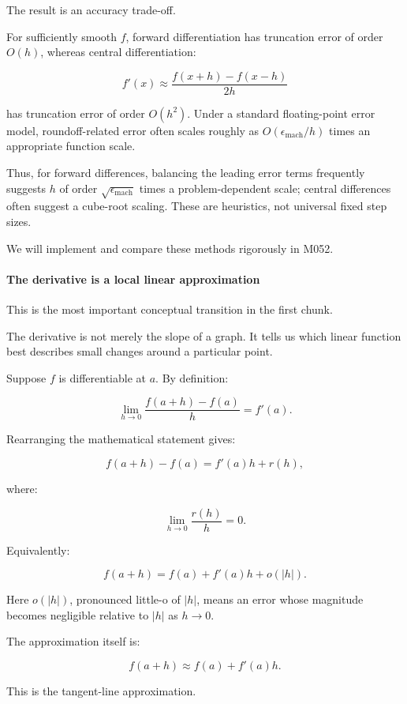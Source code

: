 The result is an accuracy trade-off.

For sufficiently smooth \(f\), forward differentiation has truncation error of order \(O(h)\), whereas central differentiation:

\[
f'(x)\approx\frac{f(x+h)-f(x-h)}{2h}
\]

has truncation error of order \(O(h^2)\). Under a standard floating-point error model, roundoff-related error often scales roughly as \(O(\epsilon_{\mathrm{mach}}/h)\) times an appropriate function scale.

Thus, for forward differences, balancing the leading error terms frequently suggests \(h\) of order \(\sqrt{\epsilon_{\mathrm{mach}}}\) times a problem-dependent scale; central differences often suggest a cube-root scaling. These are heuristics, not universal fixed step sizes.

We will implement and compare these methods rigorously in M052.

\paragraph{The derivative is a local linear approximation}\label{01-foundations-i-ch020-the-derivative-is-a-local-linear-approximation}

This is the most important conceptual transition in the first chunk.

The derivative is not merely the slope of a graph. It tells us which linear function best describes small changes around a particular point.

Suppose \(f\) is differentiable at \(a\). By definition:

\[
\lim_{h\to0} \frac{f(a+h)-f(a)}h=f'(a).
\]

Rearranging the mathematical statement gives:

\[
f(a+h)-f(a)=f'(a)h+r(h),
\]

where:

\[
\lim_{h\to0}\frac{r(h)}h=0.
\]

Equivalently:

\[
\boxed{f(a+h)=f(a)+f'(a)h+o(|h|)}.
\]

Here \(o(|h|)\), pronounced little-o of \(|h|\), means an error whose magnitude becomes negligible relative to \(|h|\) as \(h\to0\).

The approximation itself is:

\[
\boxed{f(a+h)\approx f(a)+f'(a)h}.
\]

This is the tangent-line approximation.

